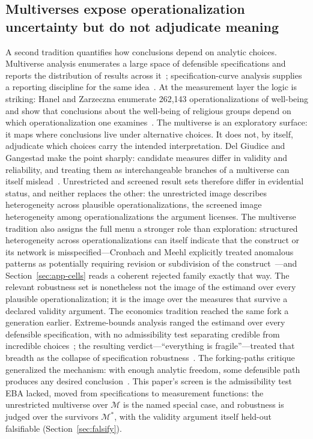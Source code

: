 \documentclass[10pt,letterpaper]{article}
\newcommand{\M}{\ensuremath{\mathcal{M}}}
\begin{document}
\subsection{Multiverses expose operationalization uncertainty but do not adjudicate meaning}
A second tradition quantifies how conclusions depend on analytic choices.
Multiverse analysis enumerates a large space of defensible specifications and reports the distribution of results across it~\cite{steegen2016}; specification-curve analysis supplies a reporting discipline for the same idea~\cite{simonsohn2020}.
At the measurement layer the logic is striking: Hanel and Zarzeczna enumerate 262{,}143 operationalizations of well-being and show that conclusions about the well-being of religious groups depend on which operationalization one examines~\cite{hanelzarzeczna2023}.
The multiverse is an exploratory surface: it maps where conclusions live under alternative choices.
It does not, by itself, adjudicate which choices carry the intended interpretation.
Del Giudice and Gangestad make the point sharply: candidate measures differ in validity and reliability, and treating them as interchangeable branches of a multiverse can itself mislead~\cite{delgiudice2021}.
Unrestricted and screened result sets therefore differ in evidential status, and neither replaces the other: the unrestricted image describes heterogeneity across plausible operationalizations, the screened image heterogeneity among operationalizations the argument licenses.
The multiverse tradition also assigns the full menu a stronger role than exploration: structured heterogeneity across operationalizations can itself indicate that the construct or its network is misspecified---Cronbach and Meehl explicitly treated anomalous patterns as potentially requiring revision or subdivision of the construct~\cite{cronbach1955}---and Section~\ref{sec:app-cells} reads a coherent rejected family exactly that way.
The relevant robustness set is nonetheless not the image of the estimand over every plausible operationalization; it is the image over the measures that survive a declared validity argument.
The economics tradition reached the same fork a generation earlier.
Extreme-bounds analysis ranged the estimand over every defensible specification, with no admissibility test separating credible from incredible choices~\cite{leamer1983}; the resulting verdict---``everything is fragile''---treated that breadth as the collapse of specification robustness~\cite{salaimartin1997}.
The forking-paths critique generalized the mechanism: with enough analytic freedom, some defensible path produces any desired conclusion~\cite{gelmanloken2014}.
This paper's screen is the admissibility test EBA lacked, moved from specifications to measurement functions: the unrestricted multiverse over $\M$ is the named special case, and robustness is judged over the survivors $\M^*$, with the validity argument itself held-out falsifiable (Section~\ref{sec:falsify}).
\end{document}
